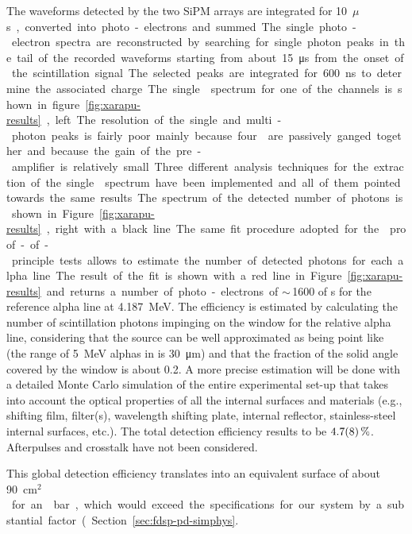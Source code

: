 The waveforms detected by the two SiPM arrays are integrated for \SI{10}{$\mu$s}, converted into photo-electrons and summed. 
The single photo-electron spectra are reconstructed by searching for single photon peaks in  the tail of the recorded waveforms starting from about \SI{15}{\micro\second} from the onset of the scintillation signal. The selected peaks are integrated for \SI{600}{ns} to determine the associated charge. The single \phel spectrum for one of the channels is shown in figure \ref{fig:xarapu-results}, left. The resolution of the single and multi-photon peaks is fairly poor mainly because  four  are passively ganged together and because the gain of the pre-amplifier is relatively small. Three different analysis techniques for the extraction of the single \phel spectrum have been implemented and all of them pointed towards the same results.

The spectrum of the detected number of photons is shown in Figure~\ref{fig:xarapu-results}, right with a black line. The same fit procedure adopted for the  proof-of-principle tests allows to estimate the number of detected photons for each alpha line. The result of the fit is shown with a red line in Figure~\ref{fig:xarapu-results} and returns a number of photo-electrons of $\sim\,$1600 of \phel{}s for the reference alpha line at \SI{4.187}{MeV}. The efficiency is estimated by calculating the number of scintillation photons impinging on the  window for the relative alpha line, considering that the source can be well approximated as being point like (the range of \SI{5}{MeV} alphas in \lar is \SI{30}{\micro\meter}) and that the fraction of the solid angle covered by the  window is about 0.2. 
A more precise estimation  will be done with  a detailed Monte Carlo simulation of the entire experimental set-up that takes into account the optical properties of all the internal surfaces and materials (e.g., shifting film, filter(s), wavelength shifting plate, internal reflector, stainless-steel internal surfaces, etc.).  The total detection efficiency results to be $\SI{4.7\pm0.8}{\%}$. Afterpulses and crosstalk have not been considered.

This global detection efficiency translates into an equivalent surface of about \SI{90}{cm$^2$} for an  bar, which would exceed the  specifications for our system by a substantial factor (Section~\ref{sec:fdsp-pd-simphys}.


